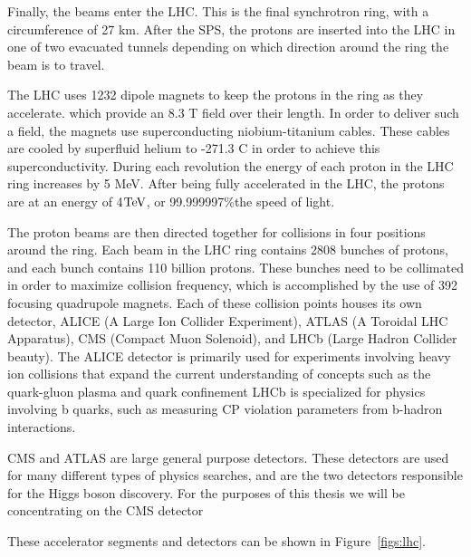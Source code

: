 Finally, the beams enter the LHC.  This is the final synchrotron ring, with a circumference of 27 km.  
After the SPS, the protons are inserted into the LHC in one of two evacuated tunnels depending on which direction around the ring the beam is to travel.  

The LHC uses 1232 dipole magnets to keep the protons in the ring as they accelerate. which provide an 8.3 T field over their length.  
In order to deliver such a field, the magnets use superconducting niobium-titanium cables.  
These cables are cooled by superfluid helium to -271.3 C in order to achieve this superconductivity.  
During each revolution the energy of each proton in the LHC ring increases by 5 MeV.  
After being fully accelerated in the LHC, the protons are at an energy of 4$\mathrm{TeV}$, or 99.999997\%the speed of light.

The proton beams are then directed together for collisions in four positions around the ring.  
Each beam in the LHC ring contains 2808 bunches of protons, and each bunch contains 110 billion protons. 
These bunches need to be collimated in order to maximize collision frequency, which is accomplished by the use of 392 focusing quadrupole magnets.   
Each of these collision points houses its own detector, ALICE (A Large Ion Collider Experiment), ATLAS (A Toroidal LHC Apparatus), 
CMS (Compact Muon Solenoid), and LHCb (Large Hadron Collider beauty).  
The ALICE detector is primarily used for experiments involving heavy ion collisions that expand the current 
understanding of concepts such as the quark-gluon plasma and quark confinement   
LHCb is specialized for physics involving b quarks, such as measuring CP violation parameters from b-hadron interactions.  

CMS and ATLAS are large general purpose detectors.  
These detectors are used for many different types of physics searches, and are the two detectors responsible for the Higgs boson discovery.  
For the purposes of this thesis we will be concentrating on the CMS detector
  
These accelerator segments and detectors can be shown in Figure~\ref{figs:lhc}.


